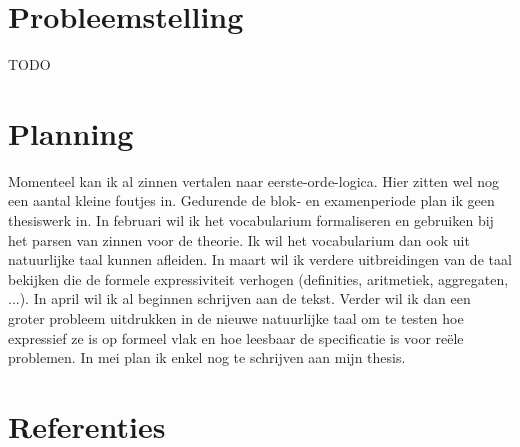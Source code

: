 \documentclass[]{article}
\theoremstyle{definition}
\begin{document}

\section{Probleemstelling}
TODO

\section{Planning}
Momenteel kan ik al zinnen vertalen naar eerste-orde-logica. Hier zitten wel nog een aantal kleine foutjes in.
Gedurende de blok- en examenperiode plan ik geen thesiswerk in. In februari wil ik het vocabularium formaliseren en gebruiken bij het parsen van zinnen voor de theorie. Ik wil het vocabularium dan ook uit natuurlijke taal kunnen afleiden. In maart wil ik verdere uitbreidingen van de taal bekijken die de formele expressiviteit verhogen (definities, aritmetiek, aggregaten, ...). In april wil ik al beginnen schrijven aan de tekst. Verder wil ik dan een groter probleem uitdrukken in de nieuwe natuurlijke taal om te testen hoe expressief ze is op formeel vlak en hoe leesbaar de specificatie is voor reële problemen. In mei plan ik enkel nog te schrijven aan mijn thesis.

\pagebreak
\section{Referenties}


\end{document}
